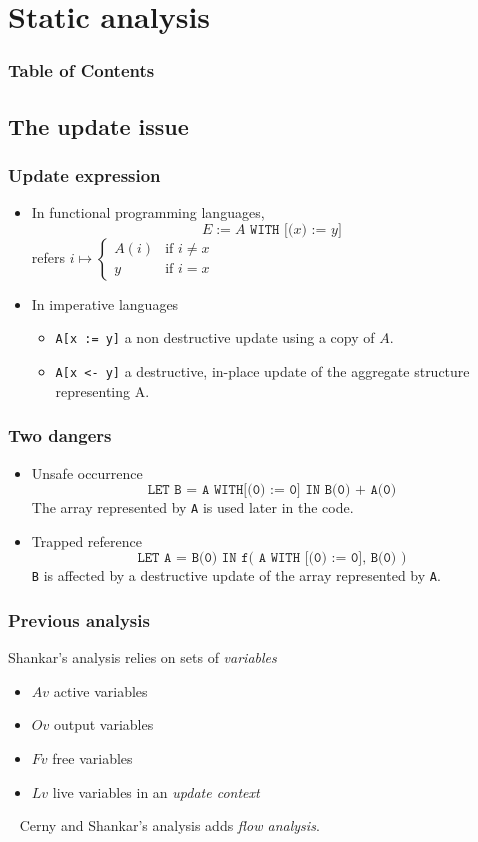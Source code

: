 \documentclass{beamer}
\newcommand{\cl}[1]{\texttt{#1}}
\begin{document}
\section{Static analysis}
\begin{frame}
\frametitle{Table of Contents}
\tableofcontents[currentsection]
\end{frame}

\subsection{The update issue}

\begin{frame}
\frametitle{Update expression}
\begin{itemize}
\itemsep2em
\item In functional programming languages,
$$ E := A \cl{ WITH [($x$) := $y$]} $$
refers $i \mapsto \left\lbrace \begin{array}{ll}
A(i) & \text{if $i \neq x$} \\
y & \text{if } i = x
\end{array} \right. $
\item In imperative languages
\begin{itemize}
\item \cl{A[x := y]} a non destructive update using a copy of $A$.
\item \cl{A[x <- y]} a destructive, in-place update of the aggregate structure representing A.
\end{itemize}
\end{itemize}

\end{frame}


\begin{frame}
\frametitle{Two dangers}
\begin{itemize}
\itemsep2em
\item Unsafe occurrence
$$ \cl{LET B = A WITH[(0) := 0] IN B(0) + A(0)} $$
The array represented by \cl{A} is used later in the code.
\item Trapped reference
$$ \cl{LET A = B(0) IN f( A WITH [(0) := 0], B(0) )} $$
\cl{B} is affected by a destructive update of the array represented by \cl{A}.
\end{itemize}

\end{frame}


\begin{frame}
\frametitle{Previous analysis}
Shankar's analysis relies on sets of \emph{variables}
\begin{itemize}
\item $Av$ active variables
\item $Ov$ output variables
\item $Fv$ free variables
\item $Lv$ live variables in an \emph{update context}
\end{itemize}
\ \newline
Cerny and Shankar's analysis adds \emph{flow analysis}.
\end{frame}
\end{document}
